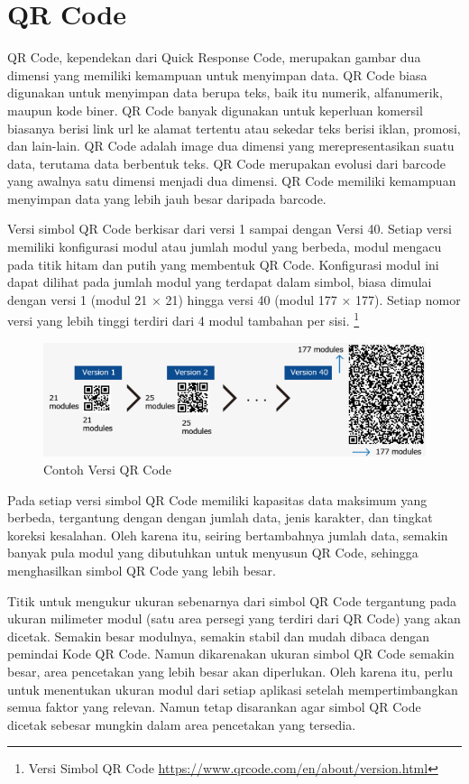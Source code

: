 \cite{pressman2019software}

\section{QR Code}
QR Code, kependekan dari Quick Response Code, merupakan gambar dua dimensi yang memiliki kemampuan untuk menyimpan data. QR Code biasa digunakan untuk menyimpan data berupa teks, baik itu numerik, alfanumerik, maupun kode biner. QR Code banyak digunakan untuk keperluan komersil biasanya berisi link url ke alamat tertentu atau sekedar teks berisi iklan, promosi, dan lain-lain. QR Code adalah image dua dimensi yang merepresentasikan suatu data, terutama data berbentuk teks. QR Code merupakan evolusi dari barcode yang awalnya satu dimensi menjadi dua dimensi. QR Code memiliki kemampuan menyimpan data yang
lebih jauh besar daripada barcode.

Versi simbol QR Code berkisar dari versi 1 sampai dengan Versi 40. Setiap versi memiliki konfigurasi modul atau jumlah modul yang berbeda, modul mengacu pada titik hitam dan putih yang membentuk QR Code.
Konfigurasi modul ini dapat dilihat pada jumlah modul yang terdapat dalam simbol, biasa dimulai dengan versi 1 (modul 21 × 21) hingga versi 40 (modul 177 × 177). Setiap nomor versi yang lebih tinggi terdiri dari 4 modul tambahan per sisi. \footnote{Versi Simbol QR Code \url{https://www.qrcode.com/en/about/version.html}}

\begin{figure}[H]
	\centering
	\includegraphics[scale=0.7]{Gambar/versiQR.png}
	\caption{Contoh Versi QR Code} 
	\label{fig:versiQR}
\end{figure}

Pada setiap versi simbol QR Code memiliki kapasitas data maksimum yang berbeda, tergantung dengan dengan jumlah data, jenis karakter, dan tingkat koreksi kesalahan. Oleh karena itu, seiring bertambahnya jumlah data, semakin banyak pula modul yang dibutuhkan untuk menyusun QR Code, sehingga menghasilkan simbol QR Code yang lebih besar.

Titik untuk mengukur ukuran sebenarnya dari simbol QR Code tergantung pada ukuran milimeter modul (satu area persegi yang terdiri dari QR Code) yang akan dicetak. Semakin besar modulnya, semakin stabil dan mudah dibaca dengan pemindai Kode QR Code. Namun dikarenakan ukuran simbol QR Code semakin besar, area pencetakan yang lebih besar akan diperlukan. Oleh karena itu, perlu untuk menentukan ukuran modul dari setiap aplikasi setelah mempertimbangkan semua faktor yang relevan. Namun tetap disarankan agar simbol QR Code dicetak sebesar mungkin dalam area pencetakan yang tersedia.

